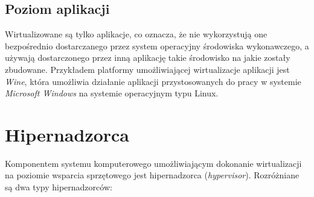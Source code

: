 \documentclass[polish, a4paper, 12pt, oneside]{book}
\begin{document}
	\subsection {Poziom aplikacji}
	Wirtualizowane są tylko aplikacje, co oznacza, że nie wykorzystują one bezpośrednio dostarczanego przez system operacyjny środowiska wykonawczego, a używają dostarczonego przez inną aplikację takie środowisko na jakie zostały zbudowane. Przykładem platformy umożliwiającej wirtualizacje aplikacji jest \textit{Wine}\cite{wine}, która umożliwia działanie aplikacji przystosowanych do pracy w systemie \textit{Microsoft Windows}\cite{windows} na systemie operacyjnym typu Linux.
	
	\section{Hipernadzorca}
	Komponentem systemu komputerowego umożliwiającym dokonanie wirtualizacji na poziomie wsparcia sprzętowego jest hipernadzorca (\textit{hypervisor}). Rozróżniane są dwa typy hipernadzorców:
	
\end{document}
